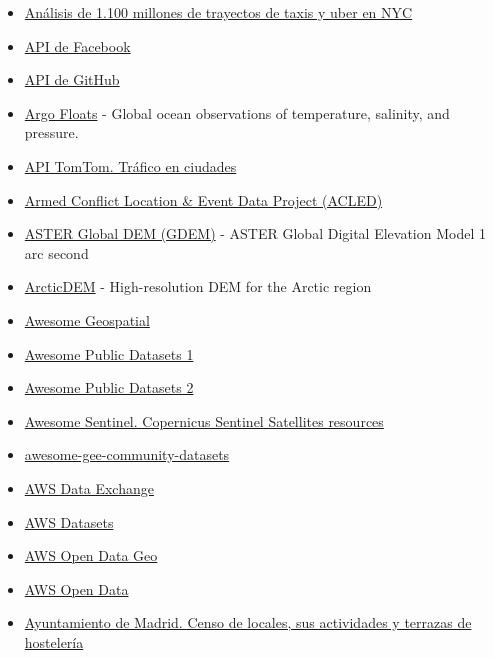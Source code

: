 \documentclass[
]{article}
\begin{document}
\begin{itemize}
{  data 2018}
\item
  \href{https://github.com/toddwschneider/nyc-taxi-data}{Análisis de
  1.100 millones de trayectos de taxis y uber en NYC}
\item
  \href{https://developers.facebook.com/docs/graph-api}{API de Facebook}
\item
  \href{https://developer.github.com/v3/}{API de GitHub}
\item
  \href{https://argo.ucsd.edu/}{Argo Floats} - Global ocean observations
  of temperature, salinity, and pressure.
\item
  \href{http://developer.tomtom.com/products/onlinenavigation/onlinetraffic/onlinetrafficflow}{API
  TomTom. Tráfico en ciudades}
\item
  \href{https://acleddata.com/}{Armed Conflict Location \& Event Data
  Project (ACLED)}
\item
  \href{https://lpdaac.usgs.gov/products/astgtmv003/}{ASTER Global DEM
  (GDEM)} - ASTER Global Digital Elevation Model 1 arc second
\item
  \href{https://www.pgc.umn.edu/data/arcticdem/}{ArcticDEM} -
  High-resolution DEM for the Arctic region
\item
  \href{https://github.com/sacridini/Awesome-Geospatial}{Awesome
  Geospatial}
\item
  \href{https://github.com/dipanjanS/awesome-public-datasets}{Awesome
  Public Datasets 1}
\item
  \href{https://github.com/awesomedata/awesome-public-datasets}{Awesome
  Public Datasets 2}
\item
  \href{https://github.com/Fernerkundung/awesome-sentinel}{Awesome
  Sentinel. Copernicus Sentinel Satellites resources}
\item
  \href{https://github.com/samapriya/awesome-gee-community-datasets}{awesome-gee-community-datasets}
\item
  \href{https://docs.aws.amazon.com/data-exchange/}{AWS Data Exchange}
\item
  \href{https://registry.opendata.aws/}{AWS Datasets}
\item
  \href{https://github.com/opengeos/aws-open-data-geo}{AWS Open Data
  Geo}
\item
  \href{https://github.com/opengeos/aws-open-data}{AWS Open Data}
\item
  \href{https://datos.gob.es/es/catalogo/l01280796-censo-de-locales-sus-actividades-y-terrazas-de-hosteleria-y-restauracion-historico1}{Ayuntamiento
  de Madrid. Censo de locales, sus actividades y terrazas de hostelería
}
\end{itemize}
\end{document}
